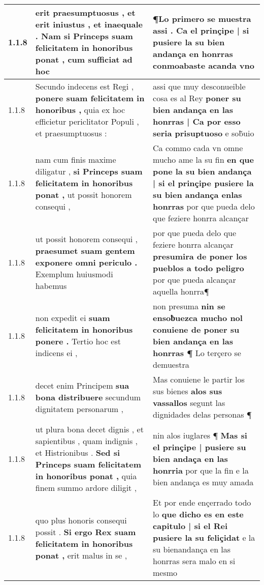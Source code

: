 \begin{tabular}{|p{1cm}|p{6.5cm}|p{6.5cm}|}
1.1.8 & erit praesumptuosus , et erit iniustus , et inaequale . \textbf{ Nam si Princeps suam felicitatem in honoribus ponat , } cum sufficiat ad hoc & ¶Lo primero se muestra assi . \textbf{ Ca el prinçipe | si pusiere la su bien andança en honrras } conmoabaste acanda vno \\\hline
1.1.8 & Secundo indecens est Regi , \textbf{ ponere suam felicitatem in honoribus , } quia ex hoc efficietur periclitator Populi , et praesumptuosus : & assi que muy desconueible cosa es al Rey \textbf{ poner su bien andança en las honrras | Ca por esso seria prisuptuoso } e sob̃uio \\\hline
1.1.8 & nam cum finis maxime diligatur , \textbf{ si Princeps suam felicitatem in honoribus ponat , } ut possit honorem consequi , & Ca commo cada vn omne mucho ame la su fin \textbf{ en que pone la su bien andança | si el prinçipe pusiere la su bien andança enlas honrras } por que pueda delo que feziere honrra alcançar \\\hline
1.1.8 & ut possit honorem consequi , \textbf{ praesumet suam gentem exponere omni periculo . } Exemplum huiusmodi habemus & por que pueda delo que feziere honrra alcançar \textbf{ presumira de poner los pueblos a todo peligro } por que pueda alcançar aquella honrra¶ \\\hline
1.1.8 & non expedit ei \textbf{ suam felicitatem in honoribus ponere . } Tertio hoc est indicens ei , & non presuma \textbf{ nin se ensoƀuezca mucho nol conuiene de poner su bien andança en las honrras ¶ } Lo terçero se demuestra \\\hline
1.1.8 & decet enim Principem \textbf{ sua bona distribuere } secundum dignitatem personarum , & Mas conuiene le partir los sus bienes \textbf{ alos sus vassallos } segunt las dignidades delas personas ¶ \\\hline
1.1.8 & ut plura bona decet dignis , et sapientibus , quam indignis , et Histrionibus . \textbf{ Sed si Princeps suam felicitatem in honoribus ponat , } quia finem summo ardore diligit , & nin alos iuglares ¶ \textbf{ Mas si el prinçipe | pusiere su bien andaça en las honrria } por que la fin e la bien andança es muy amada \\\hline
1.1.8 & quo plus honoris consequi possit . \textbf{ Si ergo Rex suam felicitatem in honoribus ponat , } erit malus in se , & Et por ende ençerrado todo lo \textbf{ que dicho es en este capitulo | si el Rei pusiere la su feliçidat } e la su bienandança en las honrras sera malo en si mesmo \\\hline

\end{tabular}
